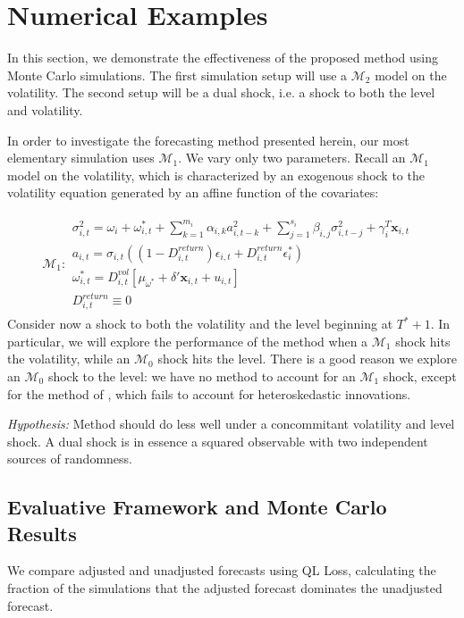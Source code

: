 \documentclass[11pt]{article}
\newcommand{\x}{\textbf{x}}
\def\mbf#1{\mathbf{#1}} %
\def\mc#1{\mathcal{#1}} %
\def\mc#1{\mathcal{#1}}
\theoremstyle{definition}
\begin{document}
\section{Numerical Examples}

In this section, we demonstrate the effectiveness of the proposed method using Monte Carlo simulations.  The first simulation setup will use a $\mc{M}_{2}$ model on the volatility.  The second setup will be a dual shock, i.e. a shock to both the level and volatility.

In order to investigate the forecasting method presented herein, our most elementary simulation uses $\mc{M}_1$.  We vary only two parameters.  Recall an $\mc{M}_1$ model on the volatility, which is characterized by an exogenous shock to the volatility equation generated by an affine function of the covariates:

\begin{align*}
  \mc{M}_1 \colon \begin{array}{l}
     \sigma^{2}_{i,t} = \omega_{i} + \omega^{*}_{i,t} + \sum^{m_{i}}_{k=1}\alpha_{i,k}a^{2}_{i,t-k} + \sum_{j=1}^{s_{i}}\beta_{i,j}\sigma_{i,t-j}^{2} + \gamma_{i}^{T} \x_{i,t} \text{ }\\[.2cm]
     a_{i,t} = \sigma_{i,t}((1-D^{return}_{i,t})\epsilon_{i,t} + D^{return}_{i,t}\epsilon^{*}_{i})\\[.2cm]
    \omega_{i,t}^{*} = D^{vol}_{i,t}[\mu_{\omega^{*}}+\delta'\mbf{x}_{i, t}+ u_{i,t}]\\[.2cm]
    D^{return}_{i,t} \equiv 0
  \end{array}
  \end{align*}
Consider now a shock to both the volatility and the level beginning at $T^{*}+1$.  In particular, we will explore the performance of the method when a  $\mc{M}_{1}$ shock hits the volatility, while an $\mc{M}_{0}$ shock hits the level.  There is a good reason we explore an $\mc{M}_{0}$ shock to the level: we have no method to account for an $\mc{M}_{1}$ shock, except for the method of \citet{lin2021minimizing}, which fails to account for heteroskedastic innovations.

\textit{Hypothesis:} Method should do less well under a concommitant volatility and level shock.  A dual shock is in essence a squared observable with two independent sources of randomness.

\subsection{Evaluative Framework and Monte Carlo Results}
We compare adjusted and unadjusted forecasts using QL Loss, calculating the fraction of the simulations that the adjusted forecast dominates the unadjusted forecast.
\end{document}
